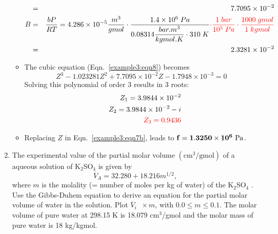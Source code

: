 \documentclass[12pts,a4paper,amsmath,amssymb,floatfix]{article}%
\renewcommand\leq{\leqslant}
\newcommand{\frc}{\displaystyle\frac}
\newcommand{\red}{\textcolor{red}}
\begin{document}
\begin{enumerate}[label=\bfseries Example \arabic*]
\begin{itemize}
\begin{eqnarray}
                &=& 7.7095\times 10^{-2} \nonumber \\
              B &=& \frc{bP}{RT} = 4.286\times 10^{-5} \frc{m^{3}}{gmol}\cdot \frc{1.4\times 10^{6}\;Pa}{0.08314 \frc{bar.m^{3}}{kgmol.K}\cdot 310\;K}\red{\cdot \frc{1\;bar}{10^{5}\;Pa}\cdot\frc{1000\; gmol}{1\; kgmol}} \nonumber \\
                &=& 2.3281\times 10^{-2} \nonumber
           \end{eqnarray}
      \item The cubic equation (Eqn.~\ref{example3:eqn8}) becomes
           \begin{displaymath}
              Z^{3} - 1.023281 Z^{2} + 7.7095\times 10^{-2} Z - 1.7948\times 10^{-3} = 0
           \end{displaymath}
           Solving this polynomial of order 3 results in 3 roots:
           \begin{eqnarray}
               &&Z_{1} = 3.9844\times 10^{-2} \nonumber\\
               &&Z_{2} = 3.9844\times 10^{-2} - i \nonumber\\
               &&\red{Z_{3} = 0.9436} \nonumber
           \end{eqnarray}
      \item Replacing $Z$ in Eqn.~\ref{example3:eqn7b}, leads to ${\bf f= 1.3250\times 10^{6}\text{ Pa}}$.
   
\end{itemize}

\clearpage

\item\label{Example:4} The experimental value of the partial molar volume $\left(\text{cm}^{3}/\text{gmol}\right)$ of a aqueous solution of K$_{2}$SO$_{4}$ is given by
                \begin{displaymath}
                   \overline{V}_{A} = 32.280 + 18.216 m^{1/2},
                \end{displaymath} 
 where $m$ is the molality (= number of moles per kg of water) of the K$_{2}$SO$_{4}$ . Use the Gibbs-Duhem equation to derive an equation for the partial molar volume of water in the solution. Plot $\overline{V}_{i}\;\;\times m$, with $0.0\leq m\leq 0.1$. The molar volume of pure water at 298.15 K is 18.079 cm$^{3}$/gmol and the molar mass of pure water is 18 kg/kgmol.

\bigskip


\end{enumerate}
\end{document}
